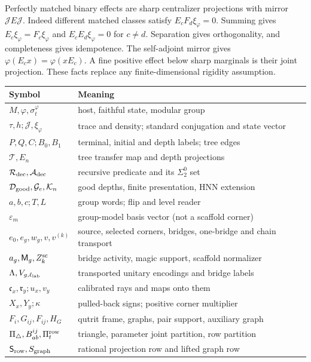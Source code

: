 Perfectly matched binary effects are sharp centralizer projections
with mirror $\mathcal JE\mathcal J$. Indeed different matched classes satisfy
$E_cF_d\xi_\varphi=0$. Summing gives
$E_c\xi_\varphi=F_c\xi_\varphi$ and
$E_cE_d\xi_\varphi=0$ for $c\ne d$. Separation gives orthogonality,
and completeness gives idempotence. The self-adjoint mirror gives
$\varphi(E_cx)=\varphi(xE_c)$. A fine positive effect below sharp
marginals is their joint projection. These facts replace any
finite-dimensional rigidity assumption.

\begin{table}[ht]
\centering\small
\begin{tabular}{@{}ll@{}}
\toprule Symbol & Meaning\\\midrule
$M,\varphi,\sigma_t^\varphi$ & host, faithful state, modular group\\
$\tau,h;\mathcal J,\xi_\varphi$ & trace and density; standard conjugation and state vector\\
$P,Q,C;B_0,B_1$ & terminal, initial and depth labels; tree edges\\
$\mathcal T,E_n$ & tree transfer map and depth projections\\
$\mathcal R_{\rm dec},\mathcal A_{\rm dec}$ & recursive predicate and its $\Sigma^0_2$ set\\
$\mathcal D_{\rm good},\mathcal G_e,\mathcal K_n$ & good depths, finite presentation, HNN extension\\
$a,b,c;T,L$ & group words; flip and level reader\\
$\varepsilon_m$ & group-model basis vector (not a scaffold corner)\\
$e_0,e_g,w_g,v,v^{(k)}$ & source, selected corners, bridges, one-bridge and chain transport\\
$a_g,\mathsf M_g,Z_k^{\rm sc}$ & bridge activity, magic support, scaffold normalizer\\
$\Lambda,V_{g,\ell_{\rm lab}}$ & transported unitary encodings and bridge labels\\
$\mathfrak c_x,\mathfrak r_y;u_x,v_y$ & calibrated rays and maps onto them\\
$X_x,Y_y;\kappa$ & pulled-back signs; positive corner multiplier\\
$F_i,G_{ij},F_{ij},H_G$ & qutrit frame, graphs, pair support, auxiliary graph\\
$\Pi_\triangle,B^{ij}_{ab},\Pi_t^{\rm row}$ & triangle, parameter joint partition, row partition\\
$\mathsf S_{\rm row},S_{\rm graph}$ & rational projection row and lifted graph row\\

\end{tabular}
\end{table}
